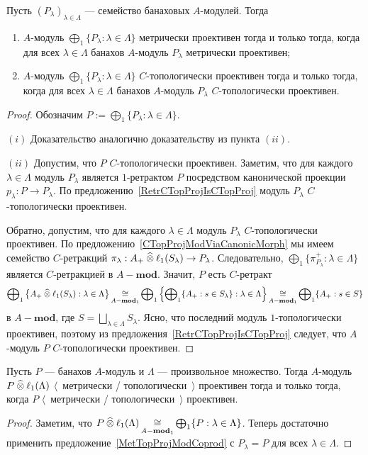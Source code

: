 \begin{proposition}\label{MetTopProjModCoprod} Пусть
${(P_\lambda)}_{\lambda\in\Lambda}$ --- семейство банаховых $A$-модулей. Тогда 
\begin{enumerate}[label = (\roman*)] 
    \item $A$-модуль $\bigoplus_1 \{P_\lambda:\lambda\in\Lambda \}$ метрически
    проективен тогда и только тогда, когда для всех $\lambda\in\Lambda$ банахов
    $A$-модуль $P_\lambda$ метрически проективен;

    \item $A$-модуль $\bigoplus_1 \{P_\lambda:\lambda\in\Lambda \}$
    $C$-топологически проективен тогда и только тогда, когда для всех
    $\lambda\in\Lambda$ банахов $A$-модуль $P_\lambda$ $C$-топологически
    проективен.
\end{enumerate}
\end{proposition}
\begin{proof} Обозначим $P:=\bigoplus_1 \{P_\lambda:\lambda\in\Lambda \}$.

$(i)$ Доказательство аналогично доказательству из пункта $(ii)$.

$(ii)$ Допустим, что $P$ $C$-топологически проективен. Заметим, что для каждого
$\lambda\in\Lambda$ модуль $P_\lambda$ является $1$-ретрактом $P$ посредством
канонической проекции $p_\lambda:P\to P_\lambda$. По
предложению~\ref{RetrCTopProjIsCTopProj} модуль $P_\lambda$ $C$-топологически
проективен.

Обратно, допустим, что для каждого $\lambda\in\Lambda$ модуль $P_\lambda$
$C$-топологически проективен. По предложению~\ref{CTopProjModViaCanonicMorph} мы
имеем семейство $C$-ретракций $\pi_\lambda:A_+\mathbin{\widehat{\otimes}}\ell_1(S_\lambda)\to
P_\lambda$. Следовательно, $\bigoplus_1 \{\pi_{P_\lambda}^+:\lambda\in\Lambda
\}$ является $C$-ретракцией в $A-\mathbf{mod}$. Значит, $P$ есть $C$-ретракт 
$$
\bigoplus\nolimits_1\left \{
    A_+\mathbin{\widehat{\otimes}} \ell_1(S_\lambda):\lambda\in\Lambda\right \}
\mathop{\mathbin{\cong}}\limits_{A-\mathbf{mod}_1}
\bigoplus\nolimits_1\left \{\bigoplus\nolimits_1 \{
    A_+:s\in S_\lambda \}:\lambda\in\Lambda\right \}
\mathop{\mathbin{\cong}}\limits_{A-\mathbf{mod}_1}
\bigoplus\nolimits_1 \{A_+:s\in S \}
$$
в $A-\mathbf{mod}$, где $S=\bigsqcup_{\lambda\in\Lambda}S_\lambda$. Ясно, что
последний модуль $1$-топологически проективен, поэтому из
предложения~\ref{RetrCTopProjIsCTopProj} следует, что $A$-модуль $P$
$C$-топологически проективен.
\end{proof}

\begin{corollary}\label{MetTopProjTensProdWithl1} Пусть $P$ --- банахов
$A$-модуль и $\Lambda$ --- произвольное множество. Тогда $A$-модуль $P\mathbin{\widehat{\otimes}}
\ell_1(\Lambda)$ $\langle$~метрически / топологически~$\rangle$ проективен тогда
и только тогда, когда $P$ $\langle$~метрически / топологически~$\rangle$
проективен.
\end{corollary}
\begin{proof} Заметим, что $P\mathbin{\widehat{\otimes}}
\ell_1(\Lambda)\mathop{\mathbin{\cong}}\limits_{A-\mathbf{mod}_1}\bigoplus_1 \{P:\lambda\in\Lambda \}$.
Теперь достаточно применить предложение~\ref{MetTopProjModCoprod} с
$P_\lambda=P$ для всех $\lambda\in\Lambda$.
\end{proof}

